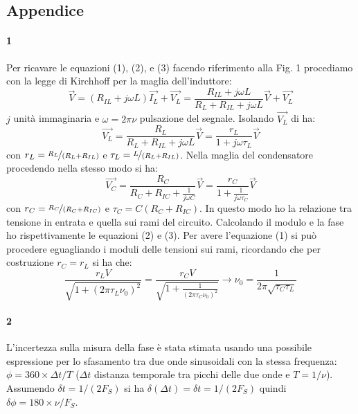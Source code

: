 \documentclass[12pt]{article}
\begin{document}
\subsection*{Appendice}
\paragraph{1} 
Per ricavare le equazioni (1), (2), e (3) facendo riferimento alla Fig. 1 procediamo con la legge di Kirchhoff per la maglia 
dell'induttore:
$$
  \vec{V}=(R_{IL}+j\omega L)\vec{I_L} + \vec{V_L}=\frac{R_{IL}+j\omega L}{R_{L}+R_{IL}+j\omega L}\vec{V}+\vec{V_L}
$$ $j$ unità immaginaria e $\omega = 2\pi \nu$ pulsazione del segnale. Isolando $\vec{V_L}$ di ha:
$$
\vec{V_L} = \frac{R_L}{R_L+R_{IL}+j\omega L}\vec{V}=\frac{r_L}{1+j\omega \tau_L} \vec{V}
$$ con $r_L = \nicefrac{R_L}{(R_L+R_{IL})}$ e $\tau_L=\nicefrac{L}{(R_L+R_{IL})}$.
Nella maglia del condensatore procedendo nella stesso modo si ha:
$$
\vec{V_C} = \frac{R_C}{R_C+R_{IC}+\frac{1}{j \omega C}}\vec{V}=\frac{r_C}{1+\frac{1}{j\omega \tau_C}} \vec{V}
$$ con $r_C = \nicefrac{R_C}{(R_C+R_{IC})}$ e $\tau_C=C(R_C+R_{IC})$. In questo modo ho la relazione
tra tensione in entrata e quella sui rami del circuito. Calcolando il modulo e la fase ho rispettivamente 
le equazioni (2) e (3). Per avere l'equazione (1) si può procedere eguagliando i moduli delle tensioni sui rami, 
ricordando che per costruzione $r_C=r_L$ si ha che:
$$
\frac{r_L V}{\sqrt{1+(2 \pi \tau_L \nu_0)^2}}=\frac{r_C V}{\sqrt{1+\frac{1}{(2 \pi \tau_C \nu_0)^2}}} \rightarrow \nu_0 = \frac{1}{2\pi \sqrt{\tau_C\tau_L}}
$$
\paragraph{2} 
L'incertezza sulla misura della fase è stata stimata usando una possibile espressione per lo sfasamento tra due onde sinusoidali con la stessa frequenza:
$\phi=360\times\Delta t/T$ ($\Delta t$ distanza temporale tra picchi delle due onde e $T=1/\nu$). Assumendo $\delta t=1/(2F_S)$ si ha $\delta(\Delta t) = \delta t = 1/(2F_S)$ 
quindi $\delta\phi =180\times \nu/F_S$. 
\end{document}
